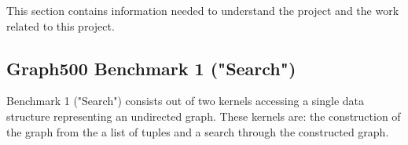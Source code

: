 This section contains information needed to understand the project and the work related to this project.




\subsection{Graph500 Benchmark 1 ("Search")}
Benchmark 1 ("Search")\cite{graph500-specs} consists out of two kernels accessing a single data structure representing an undirected graph. These kernels are: the construction of the graph from the a list of tuples and a search through the constructed graph. 

